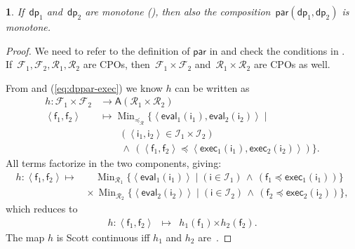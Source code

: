 \documentclass[twocolumn,english]{IEEEtran}
\theoremstyle{definition}
\theoremstyle{plain}
\theoremstyle{definition}
\theoremstyle{remark}
\theoremstyle{definition}
\theoremstyle{plain}
\newtheorem{prop}{\protect\propositionname}
\theoremstyle{plain}
\newcommand{\aword}[1]{\mathsf{#1}}
\newcommand{\vmath}[1]{\aword{#1}}
\DeclareMathOperator*{\Min}{Min}
\newcommand{\posleq}{\preceq}
\newcommand{\antichains}{\vmath{A}}
\newcommand{\ftor}{{h}}
\newcommand{\funsp}{\mathscr{F}}
\newcommand{\fun}{\vmath{f}}
\newcommand{\imp}{\vmath{i}}
\newcommand{\impsp}{\mathscr{I}}
\newcommand{\exc}{\vmath{exec}}
\newcommand{\eval}{\vmath{eval}}
\newcommand{\resleq}{\posleq_{\ressp}}
\newcommand{\ressp}{\mathscr{R}}
\newcommand{\dprob}{\vmath{dp}}
\newcommand{\dppar}{\vmath{par}}
\newcommand{\resMin}{{\Min_{\resleq}}}
\newcommand{\acprod}{\mathbin{\boldsymbol{\times}}}
\renewcommand{\resleq}{\posleq_{\ressp}}
\newcommand{\scottcontinuous}{Scott continuous\xspace}
\providecommand{\propositionname}{Proposition}
\begin{document}
\begin{prop}
\label{pro:dppar-monotone}If~$\dprob_{1}$ and~$\dprob_{2}$ are
monotone (), then also the composition~$\dppar(\dprob_{1},\dprob_{2})$
is monotone.
\end{prop}
\begin{proof}
We need to refer to the definition of $\dppar$ in 
and check the conditions in . If~$\funsp_{1},\funsp_{2},\ressp_{1},\ressp_{2}$
are CPOs, then~$\funsp_{1}\times\funsp_{2}$ and~$\ressp_{1}\times\ressp_{2}$
are CPOs as well.

From  and (\ref{eq:dppar-exec}) we know $\ftor$ can
be written as
\begin{align*}
\ftor:\funsp_{1}\times\funsp_{2} & \rightarrow\antichains(\ressp_{1}\times\ressp_{2})\\
\left\langle \fun_{1},\fun_{2}\right\rangle  & \mapsto\resMin\{\left\langle \eval_{1}(\imp_{1}),\eval_{2}(\imp_{2})\right\rangle \mid\\
 & \qquad\left(\left\langle \imp_{1},\imp_{2}\right\rangle \in\impsp_{1}\times\impsp_{2}\right)\\
 & \qquad\,\wedge\,\left(\left\langle \fun_{1},\fun_{2}\right\rangle \posleq\left\langle \exc_{1}(\imp_{1}),\exc_{2}(\imp_{2})\right\rangle \right)\}.
\end{align*}
All terms factorize in the two components, giving:{\small{}
\begin{align*}
\ftor\!:\!\left\langle \fun_{1},\fun_{2}\right\rangle \mapsto & \!\!\!\quad\Min_{\ressp_{1}}\{\left\langle \eval_{1}(\imp_{1})\right\rangle \mid\left(\imp\in\impsp_{1}\right)\,\wedge\,\left(\fun_{1}\posleq\exc_{1}(\imp_{1})\right)\}\\
 & \!\!\!\times\Min_{\ressp_{2}}\{\left\langle \eval_{2}(\imp_{2})\right\rangle \mid\left(\imp\in\impsp_{2}\right)\,\wedge\,\left(\fun_{2}\posleq\exc_{2}(\imp_{2})\right)\},
\end{align*}
}which reduces to 
\begin{eqnarray}
\ftor\colon\left\langle \fun_{1},\fun_{2}\right\rangle  & \mapsto & \ftor_{1}(\fun_{1})\acprod\ftor_{2}(\fun_{2}).\label{eq:isproduct}
\end{eqnarray}
The map $\ftor$ is \scottcontinuous iff $\ftor_{1}$ and $\ftor_{2}$
are~\cite[Lemma II.2.8]{gierz03continuous}.
\end{proof}
\end{document}
